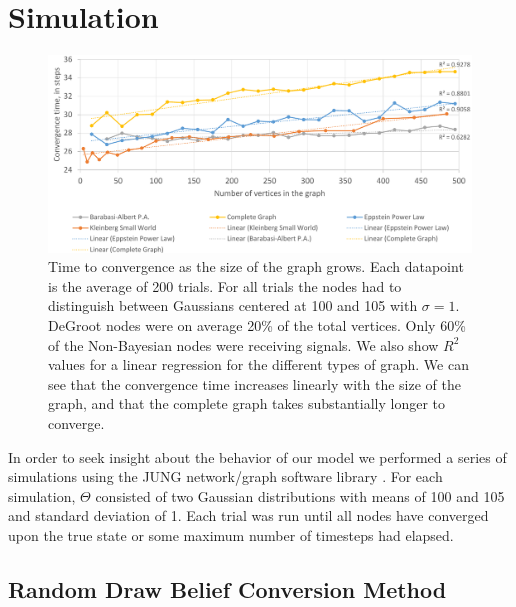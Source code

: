 \documentclass[letterpaper, 11pt, conference]{ieeeconf}
\begin{document}
\section{Simulation}
\label{sec:simulation}

\begin{figure}[t]
\centering
\includegraphics[width=.9\textwidth]{figures/convergence_time}
\caption{Time to convergence as the size of the graph grows. Each datapoint is the average of 200 trials. For all trials the nodes had to distinguish between Gaussians centered at 100 and 105 with $\sigma=1$. DeGroot nodes were on average 20\% of the total vertices. Only 60\% of the Non-Bayesian nodes were receiving signals. We also show $R^2$ values for a linear regression for the different types of graph. We can see that the convergence time increases linearly with the size of the graph, and that the complete graph takes substantially longer to converge. }
\label{fig:convergence_time}
\end{figure}

In order to seek insight about the behavior of our model we performed a series of simulations using the JUNG network/graph software library \cite{website:JUNGGraphLibrary}.  For each simulation, $\Theta$ consisted of two Gaussian distributions with means of 100 and 105 and standard deviation of 1.  Each trial was run until all nodes have converged upon the true state or some maximum number of timesteps had elapsed.

\subsection{Random Draw Belief Conversion Method}
\end{document}
